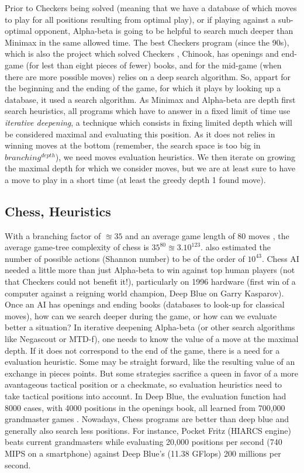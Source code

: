 Prior to Checkers being solved (meaning that we have a database of which moves to play for all positions resulting from optimal play), or if playing against a sub-optimal opponent, Alpha-beta is going to be helpful to search much deeper than Minimax in the same allowed time. The best Checkers program (since the 90s), which is also the project which solved Checkers \citep{SchaefferBBKMLLS07}, Chinook, has openings and end-game (for lest than eight pieces of fewer) books, and for the mid-game (when there are more possible moves) relies on a deep search algorithm. So, appart for the beginning and the ending of the game, for which it plays by looking up a database, it used a search algorithm. As Minimax and Alpha-beta are depth first search heuristics, all programs which have to answer in a fixed limit of time use \textit{iterative deepening}, a technique which consists in fixing limited depth which will be considered maximal and evaluating this position. As it does not relies in winning moves at the bottom (remember, the search space is too big in $branching^{depth}$), we need moves evaluation heuristics. We then iterate on growing the maximal depth for which we consider moves, but we are at least sure to have a move to play in a short time (at least the greedy depth 1 found move).

\subsection{Chess, Heuristics}
With a branching factor of $\approxeq 35$ and an average game length of 80 moves \citep{Shannon_1950}, the average game-tree complexity of chess is $35^{80}\approxeq 3.10^{123}$. \citet{Shannon_1950} also estimated the number of possible actions (Shannon number) to be of the order of $10^{43}$. Chess AI needed a little more than just Alpha-beta to win against top human players (not that Checkers could not benefit it!), particularly on 1996 hardware (first win of a computer against a reigning world champion, Deep Blue on Garry Kasparov). Once an AI has openings and ending books (databases to look-up for classical moves), how can we search deeper during the game, or how can we evaluate better a situation? In iterative deepening Alpha-beta (or other search algorithms like Negascout or MTD-f), one needs to know the value of a move at the maximal depth. If it does not correspond to the end of the game, there is a need for a evaluation heuristic. Some may be straight forward, like the resulting value of an exchange in pieces points. But some strategies sacrifice a queen in favor of a more avantageous tactical position or a checkmate, so evaluation heuristics need to take tactical positions into account. In Deep Blue, the evaluation function had 8000 cases, with 4000 positions in the openings book, all learned from 700,000 grandmaster games \citep{DeepBlue}. Nowadays, Chess programs are better than deep blue and generally also search less positions. For instance, Pocket Fritz (HIARCS engine) beats current grandmasters \citep{CitationNeeded} while evaluating 20,000 positions per second (740 MIPS on a smartphone) against Deep Blue's (11.38 GFlops) 200 millions per second.

